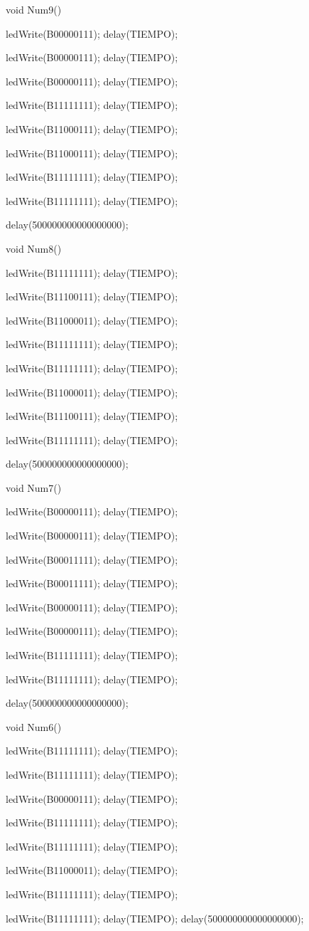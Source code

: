 \documentclass{article}
\begin{document}
void Num9(){
     
     ledWrite(B00000111); delay(TIEMPO);
   
   ledWrite(B00000111); delay(TIEMPO);
   
   ledWrite(B00000111); delay(TIEMPO);
   
   ledWrite(B11111111); delay(TIEMPO);
   
   ledWrite(B11000111); delay(TIEMPO);
   
   ledWrite(B11000111); delay(TIEMPO);
   
   ledWrite(B11111111); delay(TIEMPO);
   
   ledWrite(B11111111); delay(TIEMPO);
  
  delay(500000000000000000);}
  
void Num8(){
     
     ledWrite(B11111111); delay(TIEMPO);
   
   ledWrite(B11100111); delay(TIEMPO);
   
   ledWrite(B11000011); delay(TIEMPO);
   
   ledWrite(B11111111); delay(TIEMPO);
   
   ledWrite(B11111111); delay(TIEMPO);
   
   ledWrite(B11000011); delay(TIEMPO);
   
   ledWrite(B11100111); delay(TIEMPO);
   
   ledWrite(B11111111); delay(TIEMPO);
  
  delay(500000000000000000);}
  
void Num7(){
     
     ledWrite(B00000111); delay(TIEMPO);
   
   ledWrite(B00000111); delay(TIEMPO);
   
   ledWrite(B00011111); delay(TIEMPO);
   
   ledWrite(B00011111); delay(TIEMPO);
   
   ledWrite(B00000111); delay(TIEMPO);
   
   ledWrite(B00000111); delay(TIEMPO);
   
   ledWrite(B11111111); delay(TIEMPO);
   
   ledWrite(B11111111); delay(TIEMPO);
  
  delay(500000000000000000);}
  
void Num6(){
     ledWrite(B11111111); delay(TIEMPO);
   
   ledWrite(B11111111); delay(TIEMPO);
   
   ledWrite(B00000111); delay(TIEMPO);
   
   ledWrite(B11111111); delay(TIEMPO);
   
   ledWrite(B11111111); delay(TIEMPO);
   
   ledWrite(B11000011); delay(TIEMPO);
   
   ledWrite(B11111111); delay(TIEMPO);
   
   ledWrite(B11111111); delay(TIEMPO);
  delay(500000000000000000);}
  
\end{document}
